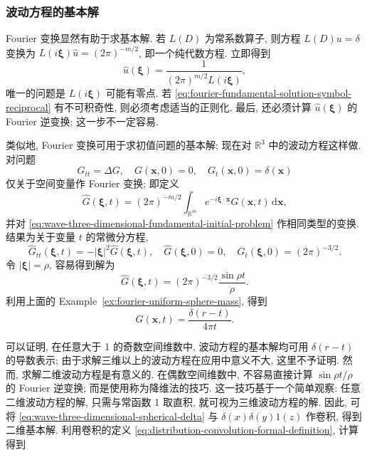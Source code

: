 \subsubsection{波动方程的基本解}\label{subsec:wave-fourier-fundamental}

Fourier 变换显然有助于求基本解. 若 $L(D)$ 为常系数算子, 则方程 $L(D)u=\delta$ 变换为 $L(i\bm{\xi})\widehat u=(2\pi)^{-m/2}$, 即一个纯代数方程. 立即得到
\begin{equation}\label{eq:fourier-fundamental-solution-symbol-reciprocal}
\widehat u(\bm{\xi})=\dfrac1{(2\pi)^{m/2}L(i\bm{\xi})},
\end{equation}
唯一的问题是 $L(i\bm{\xi})$ 可能有零点. 若 \eqref{eq:fourier-fundamental-solution-symbol-reciprocal} 有不可积奇性, 则必须考虑适当的正则化. 最后, 还必须计算 $\widehat u(\bm{\xi})$ 的 Fourier 逆变换; 这一步不一定容易.

类似地, Fourier 变换可用于求初值问题的基本解; 现在对 $\mathbb{R}^3$ 中的波动方程这样做. 对问题
\begin{equation}\label{eq:wave-three-dimensional-fundamental-initial-problem}
G_{tt}=\Delta G,\quad G(\bm{x},0)=0,\quad G_t(\bm{x},0)=\delta(\bm{x})
\end{equation}
仅关于空间变量作 Fourier 变换; 即定义
\begin{equation}\label{eq:wave-spatial-fourier-transform}
\widehat G(\bm{\xi},t)=(2\pi)^{-m/2}\int_{\mathbb{R}^m}e^{-i\bm{\xi}\cdot\bm{x}}G(\bm{x},t)\,\mathrm{d}\bm{x},
\end{equation}
并对 \eqref{eq:wave-three-dimensional-fundamental-initial-problem} 作相同类型的变换. 结果为关于变量 $t$ 的常微分方程,
\begin{equation}\label{eq:wave-fourier-transformed-oscillator-problem}
\widehat G_{tt}(\bm{\xi},t)=-|\bm{\xi}|^2\widehat G(\bm{\xi},t),\quad\widehat G(\bm{\xi},0)=0,\quad\widehat G_t(\bm{\xi},0)=(2\pi)^{-3/2}.
\end{equation}
令 $|\bm{\xi}|=\rho$, 容易得到解为
\begin{equation}\label{eq:wave-fourier-oscillator-solution}
\widehat G(\bm{\xi},t)=(2\pi)^{-3/2}\dfrac{\sin\rho t}\rho.
\end{equation}
利用上面的 Example~\ref{ex:fourier-uniform-sphere-mass}, 得到
\begin{equation}\label{eq:wave-three-dimensional-spherical-delta}
G(\bm{x},t)=\dfrac{\delta(r-t)}{4\pi t}.
\end{equation}


可以证明, 在任意大于 1 的奇数空间维数中, 波动方程的基本解均可用 $\delta(r-t)$ 的导数表示; 由于求解三维以上的波动方程在应用中意义不大, 这里不予证明. 然而, 求解二维波动方程是有意义的. 在偶数空间维数中, 不容易直接计算 $\sin\rho t/\rho$ 的 Fourier 逆变换; 而是使用称为降维法的技巧. 这一技巧基于一个简单观察: 任意二维波动方程的解, 只需与常函数 1 取直积, 就可视为三维波动方程的解. 因此, 可将 \eqref{eq:wave-three-dimensional-spherical-delta} 与 $\delta(x)\delta(y)1(z)$ 作卷积, 得到二维基本解. 利用卷积的定义 \eqref{eq:distribution-convolution-formal-definition}, 计算得到


